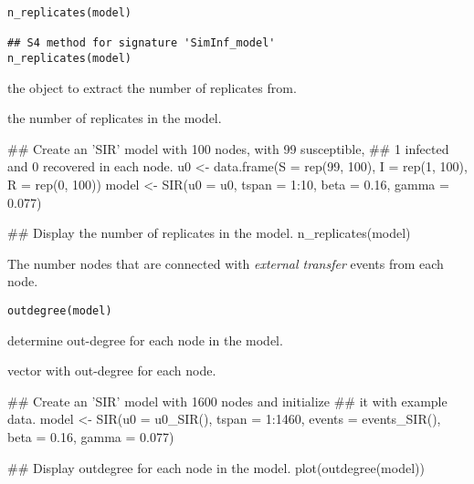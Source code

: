 \documentclass[letterpaper]{book}
\begin{document}
%
\begin{Usage}
\begin{verbatim}
n_replicates(model)

## S4 method for signature 'SimInf_model'
n_replicates(model)
\end{verbatim}
\end{Usage}
%
\begin{Arguments}
\begin{ldescription}
\item[\code{model}] the  object to extract the number of
replicates from.
\end{ldescription}
\end{Arguments}
%
\begin{Value}
the number of replicates in the model.
\end{Value}
%
\begin{Examples}
\begin{ExampleCode}
## Create an 'SIR' model with 100 nodes, with 99 susceptible,
## 1 infected and 0 recovered in each node.
u0 <- data.frame(S = rep(99, 100), I = rep(1, 100), R = rep(0, 100))
model <- SIR(u0 = u0, tspan = 1:10, beta = 0.16, gamma = 0.077)

## Display the number of replicates in the model.
n_replicates(model)
\end{ExampleCode}
\end{Examples}
%
\begin{Description}
The number nodes that are connected with \emph{external transfer}
events from each node.
\end{Description}
%
\begin{Usage}
\begin{verbatim}
outdegree(model)
\end{verbatim}
\end{Usage}
%
\begin{Arguments}
\begin{ldescription}
\item[\code{model}] determine out-degree for each node in the model.
\end{ldescription}
\end{Arguments}
%
\begin{Value}
vector with out-degree for each node.
\end{Value}
%
\begin{Examples}
\begin{ExampleCode}
## Create an 'SIR' model with 1600 nodes and initialize
## it with example data.
model <- SIR(u0 = u0_SIR(), tspan = 1:1460, events = events_SIR(),
             beta   = 0.16, gamma  = 0.077)

## Display outdegree for each node in the model.
plot(outdegree(model))
\end{ExampleCode}
\end{Examples}
\end{document}
